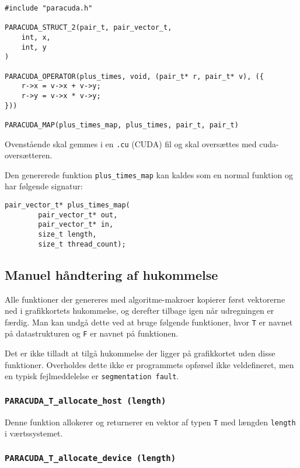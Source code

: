 \begin{verbatim}
#include "paracuda.h"

PARACUDA_STRUCT_2(pair_t, pair_vector_t,
    int, x,
    int, y
)

PARACUDA_OPERATOR(plus_times, void, (pair_t* r, pair_t* v), ({
    r->x = v->x + v->y; 
    r->y = v->x * v->y;
}))

PARACUDA_MAP(plus_times_map, plus_times, pair_t, pair_t)
\end{verbatim}

Ovenstående skal gemmes i en \verb|.cu| (CUDA) fil og skal oversættes med 
cuda-oversætteren.

Den genererede funktion \verb|plus_times_map| kan 
kaldes som en normal funktion og har følgende signatur:

\begin{verbatim}
pair_vector_t* plus_times_map(
        pair_vector_t* out, 
        pair_vector_t* in, 
        size_t length, 
        size_t thread_count);
\end{verbatim}

\subsection{Manuel håndtering af hukommelse}
\label{manual-memory}

Alle funktioner der genereres med algoritme-makroer kopierer først vektorerne ned i grafikkortets
hukommelse, og derefter tilbage igen når udregningen er færdig. Man kan undgå dette ved at bruge
følgende funktioner, hvor \verb|T| er navnet på datastrukturen og \verb|F| er navnet på funktionen.

Det er ikke tilladt at tilgå hukommelse der ligger på grafikkortet uden disse funktioner.
Overholdes dette ikke er programmets opførsel ikke veldefineret, men en typisk fejlmeddelelse
er \verb|segmentation fault|.

\subsubsection*{\texttt{PARACUDA\_T\_allocate\_host \scriptsize(length)}}

Denne funktion allokerer og returnerer en vektor af typen \verb|T| med længden \verb|length| i værtssystemet.

\subsubsection*{\texttt{PARACUDA\_T\_allocate\_device \scriptsize(length)}}

